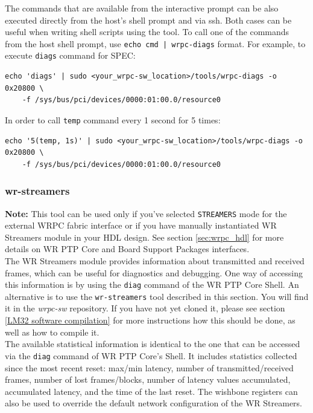 \documentclass[a4paper, 12pt]{article}
\renewcommand{\_}{\underscore\allowbreak}
\newcommand{\tts}[1]{
  \texttt{\small{#1}}}
\begin{document}
The commands that are available from the interactive prompt can be also executed directly
from the host's shell prompt and via ssh. Both cases can be useful when writing shell 
scripts using the tool. To call one of the commands from the host shell prompt,
use \texttt{echo cmd | wrpc-diags} format. For example, to execute
\texttt{diags} command for SPEC:
\begin{lstlisting}
echo 'diags' | sudo <your_wrpc-sw_location>/tools/wrpc-diags -o 0x20800 \
    -f /sys/bus/pci/devices/0000:01:00.0/resource0
\end{lstlisting}
In order to  call \texttt{temp} command every 1 second for 5 times:
\begin{lstlisting}
echo '5(temp, 1s)' | sudo <your_wrpc-sw_location>/tools/wrpc-diags -o 0x20800 \
    -f /sys/bus/pci/devices/0000:01:00.0/resource0
\end{lstlisting}


\subsubsection{wr-streamers}
\label{sec:wr-streamers-tool}

{\bf Note:} This tool can be used only if you've selected \tts{STREAMERS} mode
for the external WRPC fabric interface or if you have manually instantiated
WR Streamers module in your HDL design. See section \ref{sec:wrpc_hdl} for more
details on WR PTP Core and Board Support Packages interfaces.\\

The WR Streamers module provides information about transmitted and received
frames, which can be useful for diagnostics and debugging. One way of accessing
this information is by using the \texttt{diag} command of the WR PTP Core Shell.
An alternative is to use the \texttt{wr-streamers} tool described in this
section. You will find it in the \textit{wrpc-sw} repository. If
you have not yet cloned it, please see section \ref{LM32 software compilation}
for more instructions how this should be done, as well as how to compile it.\\

The available statistical information is identical to the one that can be
accessed via the \texttt{diag} command of WR PTP Core's Shell. It includes
statistics collected since the most recent reset: max/min latency, number of
transmitted/received frames, number of lost frames/blocks, number of latency
values accumulated, accumulated latency, and the time of the last reset. The
wishbone registers can also be used to override the default network
configuration of the WR Streamers.\\
\end{document}
